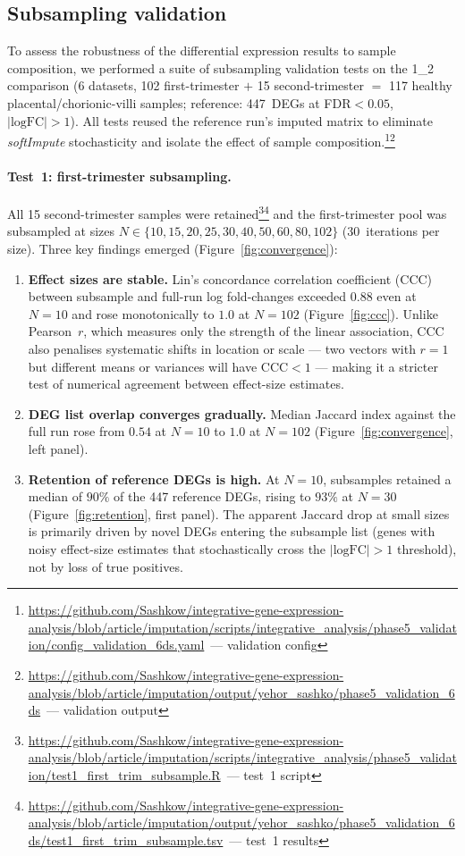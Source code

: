 \documentclass[11pt,a4paper]{article}
\newcommand{\ghb}{https://github.com/Sashkow/integrative-gene-expression-analysis/blob/article/imputation}
\newcommand{\src}[2]{\footnote{\url{\ghb/#1}~--- #2}}
\begin{document}
\subsection{Subsampling validation}
\label{sec:validation}

To assess the robustness of the differential expression results
to sample composition, we performed a suite of subsampling
validation tests on the 1\_2 comparison (6 datasets, 102
first-trimester $+$ 15 second-trimester $=$ 117 healthy
placental/chorionic-villi samples; reference: 447~DEGs at FDR${}<0.05$,
$|\text{logFC}|>1$). All tests reused the reference run's
imputed matrix to eliminate \textit{softImpute} stochasticity and
isolate the effect of sample
composition.\src{scripts/integrative_analysis/phase5_validation/config_validation_6ds.yaml}{validation config}\src{output/yehor_sashko/phase5_validation_6ds}{validation output}

\paragraph{Test~1: first-trimester subsampling.}
All 15 second-trimester samples were
retained\src{scripts/integrative_analysis/phase5_validation/test1_first_trim_subsample.R}{test~1 script}\src{output/yehor_sashko/phase5_validation_6ds/test1_first_trim_subsample.tsv}{test~1 results}
and the
first-trimester pool was subsampled at sizes
$N \in \{10, 15, 20, 25, 30, 40, 50, 60, 80, 102\}$
(30~iterations per size). Three key findings emerged
(Figure~\ref{fig:convergence}):

\begin{enumerate}
  \item \textbf{Effect sizes are stable.} Lin's concordance
    correlation coefficient \citep{Lin1989}
    (CCC) between subsample and
    full-run log fold-changes exceeded $0.88$ even at
    $N\!=\!10$ and rose monotonically to $1.0$ at $N\!=\!102$
    (Figure~\ref{fig:ccc}). Unlike Pearson~$r$, which measures
    only the strength of the linear association, CCC also
    penalises systematic shifts in location or scale ---
    two vectors with $r = 1$ but different means or variances
    will have $\text{CCC} < 1$ --- making it a stricter test of
    numerical agreement between effect-size estimates.
  \item \textbf{DEG list overlap converges gradually.} Median
    Jaccard index against the full run rose from $0.54$ at
    $N\!=\!10$ to $1.0$ at $N\!=\!102$
    (Figure~\ref{fig:convergence}, left panel).
  \item \textbf{Retention of reference DEGs is high.}
    At $N\!=\!10$, subsamples retained a median of $90\%$ of
    the 447 reference DEGs, rising to $93\%$ at $N\!=\!30$
    (Figure~\ref{fig:retention}, first panel). The apparent
    Jaccard drop at small sizes is primarily driven by novel
    DEGs entering the subsample list (genes with noisy
    effect-size estimates that stochastically cross the
    $|\text{logFC}|\!>\!1$ threshold), not by loss of true
    positives.
\end{enumerate}
\end{document}
